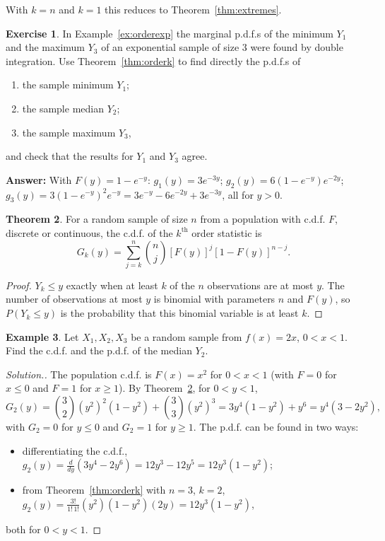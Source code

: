 \documentclass[12pt,a4paper]{report}
\theoremstyle{definition}
\newtheorem{thm}{Theorem}[section]
\newtheorem{example}[thm]{Example}
\newtheorem{exe}[thm]{Exercise}
\theoremstyle{plain}
\newenvironment{solution}
  {\renewcommand{\qedsymbol}{}\begin{proof}[\textit{Solution}.]}
  {\end{proof}}
\begin{document}
With $k = n$ and $k = 1$ this reduces to Theorem~\ref{thm:extremes}.

\begin{exe}
\label{exe:orderexp}
In Example~\ref{ex:orderexp} the marginal p.d.f.s of the minimum $Y_1$ and the
maximum $Y_3$ of an exponential sample of size $3$ were found by double
integration. Use Theorem~\ref{thm:orderk} to find directly the p.d.f.s of
\begin{enumerate}
\item[(i)] the sample minimum $Y_1$;
\item[(ii)] the sample median $Y_2$;
\item[(iii)] the sample maximum $Y_3$,
\end{enumerate}
and check that the results for $Y_1$ and $Y_3$ agree.

\textbf{Answer:} With $F(y) = 1 - e^{-y}$: $g_1(y) = 3e^{-3y}$;
$g_2(y) = 6(1 - e^{-y})e^{-2y}$; $g_3(y) = 3(1 - e^{-y})^2e^{-y} = 3e^{-y} -
6e^{-2y} + 3e^{-3y}$, all for $y>0$.
\end{exe}

\begin{thm}
\label{thm:ordercdf}
For a random sample of size $n$ from a population with c.d.f. $F$, discrete or
continuous, the c.d.f. of the $k^{\text{th}}$ order statistic is
\[G_k(y) = \sum^n_{j = k}\binom{n}{j}[F(y)]^j[1 - F(y)]^{n-j} .\]
\end{thm}

\begin{proof}
$Y_k\leq y$ exactly when at least $k$ of the $n$ observations are at most $y$.
The number of observations at most $y$ is binomial with parameters $n$ and
$F(y)$, so $P(Y_k\leq y)$ is the probability that this binomial variable is at
least $k$.
\end{proof}

\begin{example}
\label{ex:ordercdf}
Let $X_1, X_2, X_3$ be a random sample from $f(x) = 2x$, $0< x < 1$. Find the
c.d.f. and the p.d.f. of the median $Y_2$.
\end{example}

\begin{solution}
The population c.d.f. is $F(x) = x^2$ for $0<x<1$ (with $F = 0$ for $x\leq 0$
and $F = 1$ for $x\geq 1$). By Theorem~\ref{thm:ordercdf}, for $0<y<1$,
\[G_2(y) = \binom{3}{2}(y^2)^2(1 - y^2) + \binom{3}{3}(y^2)^3 = 3y^4(1 - y^2) +
y^6 = y^4(3 - 2y^2) ,\]
with $G_2 = 0$ for $y\leq 0$ and $G_2 = 1$ for $y\geq 1$. The p.d.f. can be found
in two ways:
\begin{itemize}
\item differentiating the c.d.f., $g_2(y) = \frac{d}{dy}(3y^4 - 2y^6) = 12y^3 -
12y^5 = 12y^3(1 - y^2)$;
\item from Theorem~\ref{thm:orderk} with $n = 3$, $k = 2$,
$g_2(y) = \frac{3!}{1!\,1!} (y^2)(1 - y^2)(2y) = 12y^3(1 - y^2)$,
\end{itemize}
both for $0 < y < 1$.
\end{solution}
\end{document}
